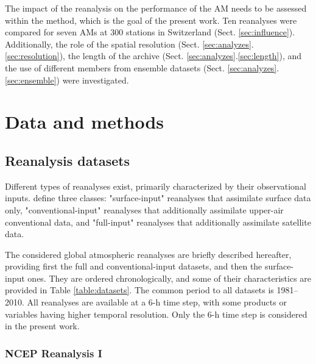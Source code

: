 \documentclass{ametsoc}
\begin{document}
The impact of the reanalysis on the performance of the AM needs to be assessed within the method, which is the goal of the present work. Ten reanalyses were compared for seven AMs at 300 stations in Switzerland (Sect. \ref{sec:influence}). Additionally, the role of the spatial resolution (Sect. \ref{sec:analyzes}.\ref{sec:resolution}), the length of the archive (Sect. \ref{sec:analyzes}.\ref{sec:length}), and the use of different members from ensemble datasets (Sect. \ref{sec:analyzes}.\ref{sec:ensemble}) were investigated.


\section{Data and methods}
\label{sec:data}

\subsection{Reanalysis datasets}

Different types of reanalyses exist, primarily characterized by their observational inputs. \citet{Fujiwara2017} define three classes: "surface-input" reanalyses that assimilate surface data only, "conventional-input" reanalyses that additionally assimilate upper-air conventional data, and "full-input" reanalyses that additionally assimilate satellite data.

The considered global atmospheric reanalyses are briefly described hereafter, providing first the full and conventional-input datasets, and then the surface-input ones. They are ordered chronologically, and some of their characteristics are provided in Table \ref{table:datasets}. The common period to all datasets is 1981--2010. All reanalyses are available at a 6-h time step, with some products or variables having higher temporal resolution. Only the 6-h time step is considered in the present work.


\subsubsection{NCEP Reanalysis I}
\end{document}
